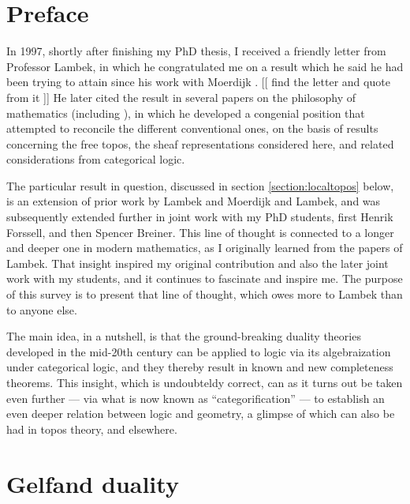 \documentclass[lambek.tex]{subfiles}
\begin{document}
\section*{Preface}

In 1997, shortly after finishing my PhD thesis, I received a friendly letter from Professor Lambek, in which he congratulated me on a result which he said he had been trying to attain since his work with Moerdijk \cite{LM1982}.  [[ find the letter and quote from it ]]  He later cited the result in several papers on the philosophy of mathematics (including \cite{L1989,L2004}), in which he developed a congenial  position that attempted to reconcile the different conventional ones, on the basis of results concerning the free topos, the sheaf representations considered here, and related considerations from categorical logic.    

The particular result in question, discussed in section \ref{section:localtopos} below, is an extension of prior work by Lambek and Moerdijk and Lambek, and was subsequently extended further in joint work with my  PhD students, first Henrik Forssell, and then Spencer Breiner.  This line of thought is  connected to a longer and deeper one in modern mathematics, as I originally learned from the papers of Lambek.  That insight inspired  my  original contribution and also the later joint work with my students, and it continues to fascinate and inspire me.   The purpose of this survey is to present that line of thought, which owes more to Lambek than to anyone else.  

The main idea, in a nutshell, is that the ground-breaking duality theories developed in the mid-20th century can be applied to logic via its algebraization under categorical logic, and they thereby result in known and new completeness theorems.  This insight, which is undoubteldy correct,  can as it turns out be taken even further --- via what is now known as ``categorification'' --- to establish an even deeper relation between logic and geometry, a glimpse of which can also be had in topos theory, and elsewhere.



\section{Gelfand duality}
\end{document}
